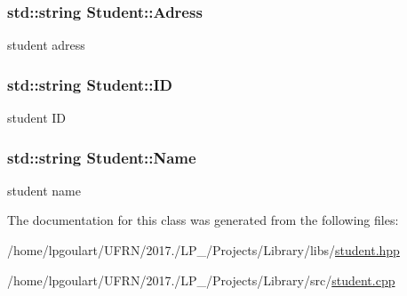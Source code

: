 \subsubsection[{\texorpdfstring{Adress}{Adress}}]{\setlength{\rightskip}{0pt plus 5cm}std\+::string Student\+::\+Adress\hspace{0.3cm}{\ttfamily [private]}}\hypertarget{classStudent_a2ce7f219072c295b7f3bc95db09625f3}{}\label{classStudent_a2ce7f219072c295b7f3bc95db09625f3}


student adress 

\subsubsection[{\texorpdfstring{ID}{ID}}]{\setlength{\rightskip}{0pt plus 5cm}std\+::string Student\+::\+ID\hspace{0.3cm}{\ttfamily [private]}}\hypertarget{classStudent_a1ae2688ebf463a93d001465c510f8970}{}\label{classStudent_a1ae2688ebf463a93d001465c510f8970}


student ID 

\subsubsection[{\texorpdfstring{Name}{Name}}]{\setlength{\rightskip}{0pt plus 5cm}std\+::string Student\+::\+Name\hspace{0.3cm}{\ttfamily [private]}}\hypertarget{classStudent_a914e02c29156e1a3b1b51cad6bbc9083}{}\label{classStudent_a914e02c29156e1a3b1b51cad6bbc9083}


student name 



The documentation for this class was generated from the following files\+:\begin{DoxyCompactItemize}
\item 
/home/lpgoulart/\+U\+F\+R\+N/2017./\+L\+P\+\_/\+Projects/\+Library/libs/\hyperlink{student_8hpp}{student.\+hpp}\item 
/home/lpgoulart/\+U\+F\+R\+N/2017./\+L\+P\+\_/\+Projects/\+Library/src/\hyperlink{student_8cpp}{student.\+cpp}\end{DoxyCompactItemize}
